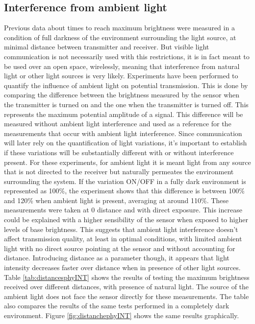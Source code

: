 \subsection{Interference from ambient light}
Previous data about times to reach maximum brightness were measured in a condition of full darkness of the environment surrounding the light source, at minimal distance between transmitter and receiver.
But visible light communication is not necessarily used with this restrictions, it is in fact meant to be used over an open space, wirelessly,  meaning that interference from natural light or other light sources is very likely.
 Experiments have been performed to quantify the influence of ambient light on potential transmission.
 This is done by comparing the difference between the brightness measured by the sensor when the transmitter is turned on and the one when the transmitter is turned off.
 This represents the maximum potential amplitude of a signal.
 This difference will be measured without ambient light interference and used as a reference for the measurements that occur with ambient light interference.
 Since communication  will later rely on the quantification of light variations, it's important to establish if these variations will be substantially different with or without interference present.
 For these experiments, for ambient light it is meant light from any source that is not directed to the receiver but naturally permeates the environment surrounding the system.
 If the variation ON/OFF in a fully dark environment is represented as 100\%, the experiment shows that this difference is between 100\% and 120\% when ambient light is present, averaging at around 110\%. 
These measurements were taken at 0 distance and with direct exposure.
This increase could be explained with a higher sensibility of the sensor when exposed to higher levels of base brightness.
This suggests that ambient light interference doesn't affect transmission quality, at least in optimal conditions, with limited ambient light with no direct source pointing at the sensor and without accounting for distance.
Introducing distance as a parameter though, it appears that light intensity decreases faster over distance when in presence of other light sources.
Table \ref{tab:distancesphyINT} shows the results of testing the maximum brightness received over different distances, with presence of natural light.
The source of the ambient light does not face the sensor directly for these measurements.
The table also compares the results of the same tests performed in a completely dark environment.
Figure \ref{fig:distanchephyINT} shows the same results graphically.

